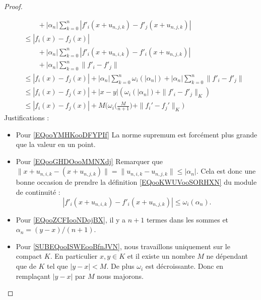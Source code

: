 \begin{proof}
\begin{subproof}
\begin{subequations}
\begin{align}
				                               & \qquad +  |\alpha_n|\sum_{k=0}^n\left| f'_i(x+ u_{n,j,k}) - f'_j(x+u_{n,j,k}) \right| \nonumber                                                \\
				                               & \leq | f_i(x)-f_j(x) |      \label{EQooYMHKooDFYPIf}                                                                                           \\
				                               & \qquad+ |\alpha_n|\sum_{k=0}^n \left| f'_i(x+ u_{n,i,k}) - f'_i(x+u_{n,j,k}) \right|\nonumber                                                  \\
				                               & \qquad + |\alpha_n|\sum_{k=0}^n  \| f'_i-f'_j \|   \nonumber                                                                                   \\
				                               & \leq  | f_i(x)-f_j(x) |+|\alpha_n|\sum_{k=0}^n  \omega_i(|\alpha_n|) + |\alpha_n|\sum_{k=0}^n  \| f'_i-f'_j \|        \label{EQooGHDOooMMNXdj} \\
				                               & \leq  \left| f_i(x) - f_j(x) \right| + |x-y| \left(\omega_i(|\alpha_n|) + \|f'_i-f'_j\|_K \right)      \label{EQooZCFIooNDojBX}                \\
				                               & \leq | f_i(x)-f_j(x) |+M\Big( \omega_i\big( \frac{ M }{ n+1 } \big)+\| f_i'-f_j' \|_K \Big)        \label{SUBEQooISWEooBfnJVN}
			\end{align}
		\end{subequations}
		Justifications :
		\begin{itemize}
			\item Pour \eqref{EQooYMHKooDFYPIf}
			      La norme supremum est forcément plus grande que la valeur en un point.
			\item Pour \eqref{EQooGHDOooMMNXdj}
			      Remarquer que \( \| x+u_{n,i,k}-(x+u_{n,j,k}) \|=\| u_{n,i,k}-u_{n,j,k} \|\leq |\alpha_n|\). Cela est donc une bonne occasion de prendre la définition \eqref{EQooKWUVooSORHXN} du module de continuité :
			      \begin{equation}
				      \left| f'_i(x+ u_{n,i,k}) - f'_i(x+u_{n,j,k}) \right|\leq \omega_i(\alpha_n) .
			      \end{equation}
			\item  Pour \eqref{EQooZCFIooNDojBX}, il y a \( n+1\) termes dans les sommes et \( \alpha_n=(y-x)/(n+1)\).
			\item Pour \eqref{SUBEQooISWEooBfnJVN}, nous travaillons uniquement sur le compact \( K\). En particulier \( x,y\in K\) et il existe un nombre \( M\) ne dépendant que de \( K\) tel que \( | y-x |<M\). De plus \( \omega_i\) est décroissante. Donc en remplaçant \( | y-x |\) par \( M\) nous majorons.
		\end{itemize}


\end{subproof}
\end{proof}
